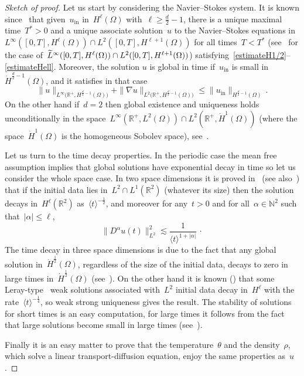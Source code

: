 \documentclass[11pt]{article}
\theoremstyle{definition}
\numberwithin{equation}{section}
\numberwithin{figure}{section}
\numberwithin{table}{section}
\newcommand*\N {\mathbb{N}}
\newcommand*\R {\mathbb{R}}
\DeclareMathOperator{\inn}{in}
\let\oldtilde\tilde
\renewcommand*{\tilde}[1]{\mathchoice{\widetilde{#1}}{\widetilde{#1}}{\oldtilde{#1}}{\oldtilde{#1}}}
\begin{document}
\begin{proof}[Sketch of proof]
Let us start by considering the Navier--Stokes system. It is known since~\cite{cheminSIAM,fujitakato} that
given~$ u_{\inn} $ in~$ H^\ell(\Omega)$ with~$\ell \geq \frac d2-1$, there is a unique maximal time~$T^*>0$ and a unique associate solution~$u$ to the Navier--Stokes equations in~$ L^\infty([0,T],H^\ell(\Omega)) \cap L^2([0,T],H^{\ell+1}(\Omega))$ for all times~$T<T^*$ (see~\cite{cheminlerner} for the case of~$\tilde L^\infty([0,T],H^\ell(\Omega)) \cap L^2([0,T],H^{\ell+1}(\Omega))$) satisfying~\eqref{estimateH1/2}--\eqref{estimateHell}. Moreover, the solution $u$ is global in time if~$u_{\inn}$ is small in~$ \dot H^{\frac d2-1}(\Omega)$, and it satisfies in that case
\[
\|u\|_{L^\infty \big(\R^+, H^{\frac d2-1}(\Omega) \big)} + \|\nabla u\|_{L^2 \big(\R^+, H^{\frac d2-1}(\Omega) \big) } \leq \|u_{\inn}\|_{H^{\frac d2-1}(\Omega)} \,.
\]
On the other hand if~$d=2$ then global existence and uniqueness holds unconditionally in the space~$ L^\infty(\R^+,L^2(\Omega)) \cap L^2(\R^+,\dot H^{1}(\Omega))$ (where the space~$\dot H^{1}(\Omega)$ is the homogeneous Sobolev space), see~\cite{leray2D}.

Let us turn to the time decay properties. In the periodic case the mean free assumption implies that global solutions have exponential decay in time so let us consider the whole space case. In two space dimensions it is proved in~\cite{wiegner} (see also~\cite{Schonbek24}) that if the initial data lies in~$L^2\cap L^1(\R^2)$ (whatever its size) then the solution decays in~$H^\ell(\R^2)$ as~$\langle t \rangle^{-\frac12}$, and moreover for any~$t >0$ and for all~$ \alpha \in \N^2 $ such that~$ |\alpha| \le \ell$,
\[
\|D^\alpha u(t)\|^2_{L^2} \lesssim \frac{1}{\langle t \rangle^{1+|\alpha|}} \, \cdotp
\]
The time decay in three space dimensions is due to the fact that any global solution in~$\dot H^{\frac 12}(\Omega)$, regardless of the size of the initial data, decays to zero in large times in~$\dot H^\frac 12 (\Omega)$ (see~\cite{GIP}). On the other hand it is known (\cite{Schonbek}) that some Leray-type~\cite{leray} weak solutions associated with~$L^2$ initial data decay in~$H^\ell$ with the rate~$\langle t\rangle^{-\frac14}$, so weak strong uniqueness gives the result. The stability of solutions for short times is an easy computation, for large times it follows from the fact that large solutions become small in large times (see~\cite{GIP,wiegner}).


Finally it is an easy matter to prove that the temperature~$\theta$ and the density~$\rho$, which solve a linear transport-diffusion equation, enjoy the same properties as~$u$.
\end{proof}%
\end{document}
